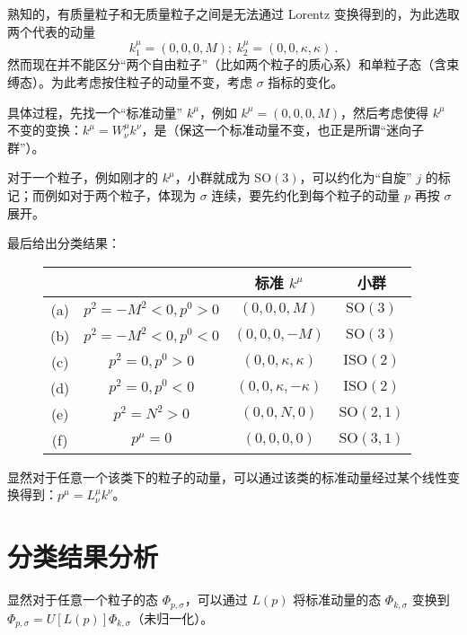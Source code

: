熟知的，有质量粒子和无质量粒子之间是无法通过 Lorentz 变换得到的，为此选取两个代表的动量
\begin{equation}
	k_1^\mu = (0, 0, 0, M); ~ k_2^\mu = (0, 0, \kappa, \kappa) ~.
\end{equation}
然而现在并不能区分“两个自由粒子”（比如两个粒子的质心系）和单粒子态（含束缚态）。为此考虑按住粒子的动量不变，考虑 $\sigma$ 指标的变化。

具体过程，先找一个“标准动量” $k^\mu$，例如 $k^\mu = (0, 0, 0, M)$，然后考虑使得 $k^\mu$ 不变的变换：$k^\mu = W^\mu_\nu k^\nu$，是（保这一个标准动量不变，也正是所谓“迷向子群”）。

对于一个粒子，例如刚才的 $k^\mu$，小群就成为 $\text{SO}(3)$，可以约化为“自旋” $j$ 的标记；而例如对于两个粒子，体现为 $\sigma$ 连续，要先约化到每个粒子的动量 $p$ 再按 $\sigma$ 展开。

最后给出分类结果：
\begin{figure}[htbp]
	\centering
	\begin{tabular}[]{cccc}
		\toprule
		~ & ~ & 标准 $k^\mu$ & 小群 \\
		\midrule
		(a) & $p^2 = -M^2 < 0, p^0 > 0$ & $(0, 0, 0, M)$ & $\text{SO}(3)$ \\
		(b) & $p^2 = -M^2 < 0, p^0 < 0$ & $(0, 0, 0, -M)$ & $\text{SO}(3)$ \\
		(c) & $p^2 = 0, p^0>0$ & $(0, 0, \kappa, \kappa)$ & $\text{ISO}(2)$ \\
		(d) & $p^2 = 0, p^0<0$ & $(0, 0, \kappa, -\kappa)$ & $\text{ISO}(2)$ \\ 
		(e) & $p^2 = N^2 > 0$ & $(0, 0, N, 0)$ & $\text{SO}(2, 1)$ \\
		(f) & $p^\mu = 0$ & $(0, 0, 0, 0)$ & $\text{SO}(3, 1)$ \\
		\bottomrule
	\end{tabular}
\end{figure}

显然对于任意一个该类下的粒子的动量，可以通过该类的标准动量经过某个线性变换得到：$p^\mu = L^\mu_\nu k^\nu$。

\section{分类结果分析}
显然对于任意一个粒子的态 $\Phi_{p, \sigma}$，可以通过 $L(p)$ 将标准动量的态 $\Phi_{k, \sigma}$ 变换到 $\Phi_{p, \sigma} = U[L(p)] \Phi_{k,\sigma}$（未归一化）。

